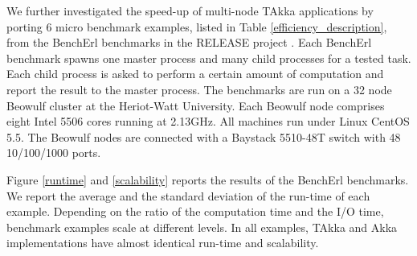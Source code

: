 We further investigated the speed-up of multi-node TAkka applications by 
porting 6 micro benchmark examples, listed in Table 
\ref{efficiency_description}, from the BenchErl benchmarks in the RELEASE 
project \cite{RELEASE}.  Each BenchErl benchmark spawns one master process and 
many child processes for a tested task.  Each child process is asked to perform 
a certain amount of computation and report the result to the master process.  
The benchmarks are run on a 32 node Beowulf cluster at the Heriot-Watt 
University. Each Beowulf node comprises eight Intel 5506 cores running at
2.13GHz. All machines run under Linux CentOS 5.5. The Beowulf nodes are
connected with a Baystack 5510-48T switch with 48 10/100/1000 ports.

Figure \ref{runtime} and \ref{scalability} reports the results of the BenchErl 
benchmarks.   We report the average and the standard deviation 
of the run-time of each example.  Depending on the ratio of the computation 
time and the I/O time, benchmark examples scale at different levels.  In 
all examples, TAkka and Akka implementations have almost identical 
run-time and scalability.


